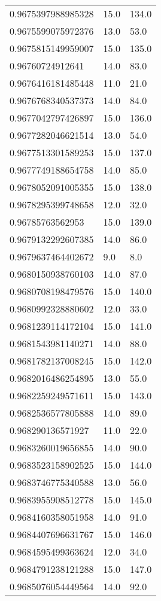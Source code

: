 \begin{center}
\begin{supertabular}[H]{p{0.30\textwidth}p{0.05\textwidth}p{0.05\textwidth}}
0.9675397988985328 & 15.0 & 134.0 \\ 
0.9675599075972376 & 13.0 & 53.0 \\ 
0.9675815149959007 & 15.0 & 135.0 \\ 
0.96760724912641 & 14.0 & 83.0 \\ 
0.9676416181485448 & 11.0 & 21.0 \\ 
0.9676768340537373 & 14.0 & 84.0 \\ 
0.9677042797426897 & 15.0 & 136.0 \\ 
0.9677282046621514 & 13.0 & 54.0 \\ 
0.9677513301589253 & 15.0 & 137.0 \\ 
0.9677749188654758 & 14.0 & 85.0 \\ 
0.9678052091005355 & 15.0 & 138.0 \\ 
0.9678295399748658 & 12.0 & 32.0 \\ 
0.96785763562953 & 15.0 & 139.0 \\ 
0.9679132292607385 & 14.0 & 86.0 \\ 
0.9679637464402672 & 9.0 & 8.0 \\ 
0.9680150938760103 & 14.0 & 87.0 \\ 
0.9680708198479576 & 15.0 & 140.0 \\ 
0.9680992328880602 & 12.0 & 33.0 \\ 
0.9681239114172104 & 15.0 & 141.0 \\ 
0.9681543981140271 & 14.0 & 88.0 \\ 
0.9681782137008245 & 15.0 & 142.0 \\ 
0.9682016486254895 & 13.0 & 55.0 \\ 
0.9682259249571611 & 15.0 & 143.0 \\ 
0.9682536577805888 & 14.0 & 89.0 \\ 
0.968290136571927 & 11.0 & 22.0 \\ 
0.9683260019656855 & 14.0 & 90.0 \\ 
0.9683523158902525 & 15.0 & 144.0 \\ 
0.9683746775340588 & 13.0 & 56.0 \\ 
0.9683955908512778 & 15.0 & 145.0 \\ 
0.9684160358051958 & 14.0 & 91.0 \\ 
0.9684407696631767 & 15.0 & 146.0 \\ 
0.9684595499363624 & 12.0 & 34.0 \\ 
0.9684791238121288 & 15.0 & 147.0 \\ 
0.9685076054449564 & 14.0 & 92.0 \\ 

\end{supertabular}
\end{center}
